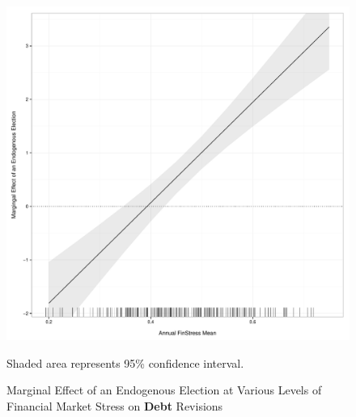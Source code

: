 \documentclass[]{article}
\begin{document}
\begin{figure}
    \caption{Marginal Effect of an Endogenous Election at Various Levels of Financial Market Stress on \textbf{Debt} Revisions}
    \label{me_finstress_endog_elect}

    \begin{center}
        \includegraphics[scale=0.4]{figures/finstress_endog_elect_me.pdf}
    \end{center}

	{\scriptsize{Shaded area represents 95\% confidence interval.}}

\end{figure}
\end{document}
